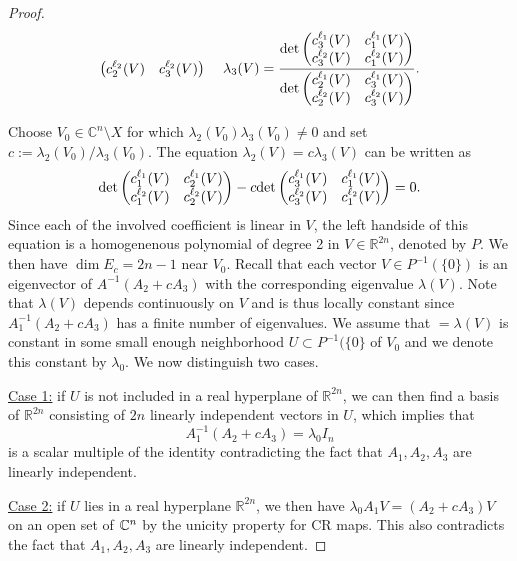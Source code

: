 \documentclass[12pt]{amsart}
\newcommand{\C}{\mathbb C}
\newcommand{\R}{\mathbb R}
\theoremstyle{remark}
\theoremstyle{example}
\theoremstyle{definition}
\numberwithin{equation}{section}
\begin{document}
\begin{proof}
$${\begin{pmatrix}
c_2^{\ell_2}(V) & c_3^{\ell_2}(V)\\ 
\end{pmatrix}} \ \ \ \ \lambda_3(V)=\frac{{\rm det}\begin{pmatrix} 
c_3^{\ell_1}(V) & c_1^{\ell_1}(V)\\
c_3^{\ell_2}(V) & c_1^{\ell_2}(V)\\ 
\end{pmatrix}}{{\rm det}\begin{pmatrix} 
c_2^{\ell_1}(V) & c_3^{\ell_1}(V)\\
c_2^{\ell_2}(V) & c_3^{\ell_2}(V)\\ 
\end{pmatrix}}.$$

Choose   $V_0 \in \C^n \setminus X$ for which    $\lambda_2(V_0)\lambda_3(V_0) \neq 0$ and  set $c:=\lambda_2(V_0)/\lambda_3(V_0)$. %
The equation $\lambda_2(V)= c\lambda_3(V)$ can be written as  
\begin{equation*}
{\rm det}\begin{pmatrix} 
c_1^{\ell_1}(V) & c_2^{\ell_1}(V)\\
c_1^{\ell_2}(V) & c_2^{\ell_2}(V)\\ 
\end{pmatrix}-c{\rm det}\begin{pmatrix} 
c_3^{\ell_1}(V) & c_1^{\ell_1}(V)\\
c_3^{\ell_2}(V) & c_1^{\ell_2}(V)\\ 
\end{pmatrix}=0.
\end{equation*}
Since each of the involved coefficient is linear in $V$, the left handside of this equation is a homogenenous polynomial of degree 2 in $V\in \R^{2n}$, denoted by $P$. We then have  $\dim E_c=2n-1$ near $V_0.$  Recall that each vector  $V\in P^{-1}(\{0\}) $ is an eigenvector of $A^{-1}
(A_2+cA_3)$ with the corresponding eigenvalue $\lambda(V)$. Note that $\lambda(V)$ depends continuously on $V$ and is thus 
locally constant since $A_{1}^{-1}(A_2+cA_3)$ has a finite number of eigenvalues. We  assume that  $=\lambda(V)$ is constant in some
 small enough  neighborhood $U \subset P^{-1}(\{0\}$ of $V_0$ and we denote this constant by $\lambda_0$.   We now distinguish two cases. 

\noindent \underline{Case 1:} if $U$ is not included in a real hyperplane of $\R^{2n}$, we can then find a basis of $\R^{2n}$ consisting of 
$2n$ linearly independent vectors in $U$, which implies that 
$$A_1^{-1}(A_2+cA_3)=\lambda_0 I_n$$ is a scalar multiple of the identity contradicting the fact that $A_1,A_2,A_3$ are linearly independent. 

\noindent \underline{Case 2:} if $U$ lies in a real hyperplane $\R^{2n}$,  we then have $\lambda_0 A_1V=(A_2 + cA_3)V$ on an open set of $\Bbb C^n$ by the unicity property for CR maps. This also contradicts the fact that $A_1,A_2,A_3$ are linearly independent.
\end{proof}
\end{document}
